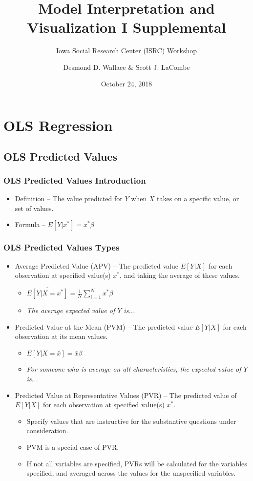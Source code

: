 \documentclass{beamer}
\title[Model Interpretation and Visualization I]{Model Interpretation and Visualization I Supplemental}
\subtitle[ISRC Workshop]{Iowa Social Research Center (ISRC) Workshop}
\author[Wallace \& LaCombe]{Desmond D. Wallace \& Scott J. LaCombe}
\institute[University of Iowa]{Department of Political Science\\The University of Iowa\\Iowa City, IA}
\date{October 24, 2018}
\begin{document}
\begin{frame}
 \titlepage
\end{frame}

\section{OLS Regression}

\subsection{OLS Predicted Values}

\begin{frame}
	\frametitle{OLS Predicted Values Introduction}
		\begin{itemize}
			\item Definition -- The value predicted for $Y$ when $X$ takes on a specific value, or set of values.
			\item Formula -- $E[Y|x^{*}]=x^{*}\beta$
		\end{itemize}
\end{frame}

\begin{frame}
	\frametitle{OLS Predicted Values Types}
		\begin{itemize}
			\item Average Predicted Value (APV) -- The predicted value $E[Y|X]$ for each observation at specified value(s) $x^{*}$, and taking the average of these values.
				\begin{itemize}
					\item $\overline{E[Y|X=x^{*}]}=\frac{1}{N}\sum_{i=1}^{N}x^{*}\beta$
					\item \textit{The average expected value of $Y$ is...}
				\end{itemize}
			\item Predicted Value at the Mean (PVM) -- The predicted value $E[Y|X]$ for each observation at its mean values.
				\begin{itemize}
					\item $E[Y|X=\bar{x}]=\bar{x}\beta$
					\item \textit{For someone who is average on all characteristics, the expected value of $Y$ is...}
				\end{itemize}
			\item Predicted Value at Representative Values (PVR) -- The predicted value of $E[Y|X]$ for each observation at specified value(s) $x^{*}$.
				\begin{itemize}
					\item Specify values that are instructive for the substantive questions under consideration.
					\item PVM is a special case of PVR.
					\item If not all variables are specified, PVRs will be calculated for the variables specified, and averaged across the values for the unspecified variables.
				\end{itemize}
		\end{itemize}
\end{frame}
\end{document}
